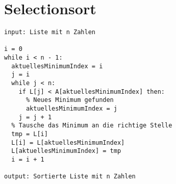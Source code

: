 \section{Selectionsort}

\begin{lstlisting}[language={pseudocode}, caption={Selectionsort}, label={lst-algo-selectionsort}]
input: Liste mit n Zahlen

i = 0
while i < n - 1:
  aktuellesMinimumIndex = i
  j = i
  while j < n:
    if L[j] < A[aktuellesMinimumIndex] then:
      % Neues Minimum gefunden
      aktuellesMinimumIndex = j
    j = j + 1
  % Tausche das Minimum an die richtige Stelle
  tmp = L[i]
  L[i] = L[aktuellesMinimumIndex]
  L[aktuellesMinimumIndex] = tmp
  i = i + 1

output: Sortierte Liste mit n Zahlen
\end{lstlisting}
